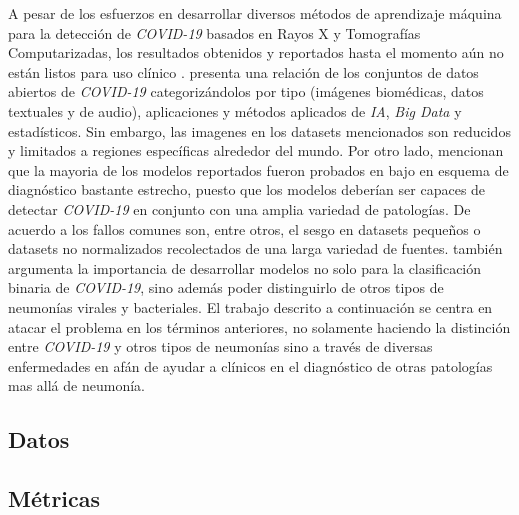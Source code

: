 A pesar de los esfuerzos en desarrollar diversos métodos de aprendizaje máquina para la detección de
\textit{COVID-19} basados en Rayos X y Tomografías Computarizadas, los resultados obtenidos y
reportados hasta el momento aún no están listos para uso clínico \cite{roberts2021common}.
\citeauthor*{shuja2021covid} presenta una relación de los conjuntos de datos abiertos de
\textit{COVID-19} categorizándolos por tipo (imágenes biomédicas,
datos textuales y de audio), aplicaciones y métodos aplicados de \textit{IA}, \textit{Big Data} y
estadísticos. Sin embargo, las imagenes en los datasets mencionados son reducidos y limitados a
regiones específicas alrededor del mundo. Por otro lado, \citeauthor{greenspan2020position} mencionan
que la mayoria de los modelos reportados fueron probados en bajo en esquema de diagnóstico bastante
estrecho, puesto que los modelos deberían ser capaces de detectar \textit{COVID-19} en conjunto
con una amplia variedad de patologías. De acuerdo a \citeauthor{roberts2021common} los fallos comunes
son, entre otros, el sesgo en datasets pequeños o datasets no normalizados recolectados de una larga
variedad de fuentes. \citeauthor{roberts2021common} también argumenta la importancia de desarrollar
modelos no solo para la clasificación binaria de \textit{COVID-19}, sino además poder distinguirlo
de otros tipos de neumonías virales y bacteriales. El trabajo descrito a continuación se centra en
atacar el problema en los términos anteriores, no solamente haciendo la distinción entre
\textit{COVID-19} y otros tipos de neumonías sino a través de diversas enfermedades en afán de ayudar
a clínicos en el diagnóstico de otras patologías mas allá de neumonía.


\subsection{Datos}


\subsection{Métricas}
